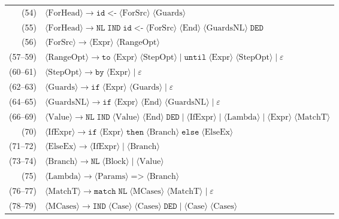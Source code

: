 \documentclass[11pt, a4paper]{article}
\begin{document}
\begin{tabular}{@{}r l@{}}
  (54)    & $\langle\text{ForHead}\rangle \to \texttt{id}\;\texttt{<-}\;\langle\text{ForSrc}\rangle\;\langle\text{Guards}\rangle$ \\
  (55)    & $\langle\text{ForHead}\rangle \to \texttt{NL}\;\texttt{IND}\;\texttt{id}\;\texttt{<-}\;\langle\text{ForSrc}\rangle\;\langle\text{End}\rangle\;\langle\text{GuardsNL}\rangle\;\texttt{DED}$ \\
  (56)    & $\langle\text{ForSrc}\rangle \to \langle\text{Expr}\rangle\;\langle\text{RangeOpt}\rangle$ \\
  (57--59)& $\langle\text{RangeOpt}\rangle \to \texttt{to}\;\langle\text{Expr}\rangle\;\langle\text{StepOpt}\rangle \mid \texttt{until}\;\langle\text{Expr}\rangle\;\langle\text{StepOpt}\rangle \mid \varepsilon$ \\
  (60--61)& $\langle\text{StepOpt}\rangle \to \texttt{by}\;\langle\text{Expr}\rangle \mid \varepsilon$ \\
  (62--63)& $\langle\text{Guards}\rangle \to \texttt{if}\;\langle\text{Expr}\rangle\;\langle\text{Guards}\rangle \mid \varepsilon$ \\
  (64--65)& $\langle\text{GuardsNL}\rangle \to \texttt{if}\;\langle\text{Expr}\rangle\;\langle\text{End}\rangle\;\langle\text{GuardsNL}\rangle \mid \varepsilon$ \\
  (66--69)& $\langle\text{Value}\rangle \to \texttt{NL}\;\texttt{IND}\;\langle\text{Value}\rangle\;\langle\text{End}\rangle\;\texttt{DED} \mid \langle\text{IfExpr}\rangle \mid \langle\text{Lambda}\rangle \mid \langle\text{Expr}\rangle\;\langle\text{MatchT}\rangle$ \\
  (70)    & $\langle\text{IfExpr}\rangle \to \texttt{if}\;\langle\text{Expr}\rangle\;\texttt{then}\;\langle\text{Branch}\rangle\;\texttt{else}\;\langle\text{ElseEx}\rangle$ \\
  (71--72)& $\langle\text{ElseEx}\rangle \to \langle\text{IfExpr}\rangle \mid \langle\text{Branch}\rangle$ \\
  (73--74)& $\langle\text{Branch}\rangle \to \texttt{NL}\;\langle\text{Block}\rangle \mid \langle\text{Value}\rangle$ \\
  (75)    & $\langle\text{Lambda}\rangle \to \langle\text{Params}\rangle\;\texttt{=>}\;\langle\text{Branch}\rangle$ \\
  (76--77)& $\langle\text{MatchT}\rangle \to \texttt{match}\;\texttt{NL}\;\langle\text{MCases}\rangle\;\langle\text{MatchT}\rangle \mid \varepsilon$ \\
  (78--79)& $\langle\text{MCases}\rangle \to \texttt{IND}\;\langle\text{Case}\rangle\;\langle\text{Cases}\rangle\;\texttt{DED} \mid \langle\text{Case}\rangle\;\langle\text{Cases}\rangle$ \\

\end{tabular}
\end{document}
